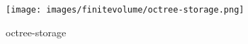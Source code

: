 \begin{figure}[ht]
    \centering
    \texttt{[image: images/finitevolume/octree-storage.png]}
    \caption{octree-storage}
    \label{fig:octree-storage}
\end{figure}
